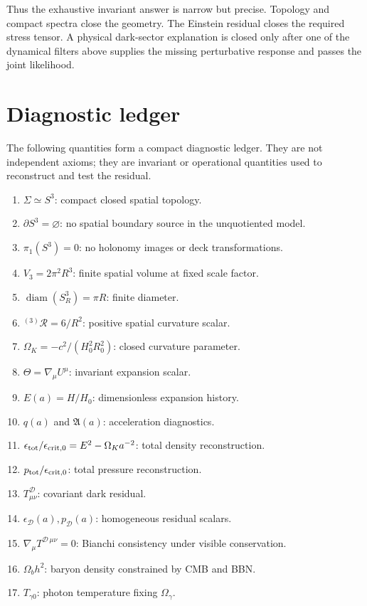 \documentclass[
  aps,
  prd,
  reprint,
  superscriptaddress,
  nofootinbib,
  floatfix,
  longbibliography
]{revtex4-2}
\theoremstyle{plain}
\theoremstyle{definition}
\theoremstyle{remark}
\newcommand{\D}{\mathcal D}
\newcommand{\crit}{\epsilon_{\mathrm{crit},0}}
\newcommand{\Omk}{\Omega_K}
\newcommand{\diam}{\operatorname{diam}}
\newcommand{\Aacc}{\mathfrak A}
\newcommand{\Thetaexp}{\Theta}
\begin{document}
Thus the exhaustive invariant answer is narrow but precise.  Topology and
compact spectra close the geometry.  The Einstein residual closes the required
stress tensor.  A physical dark-sector explanation is closed only after one of
the dynamical filters above supplies the missing perturbative response and
passes the joint likelihood.

\section{Diagnostic ledger}

The following quantities form a compact diagnostic ledger.  They are not
independent axioms; they are invariant or operational quantities used to
reconstruct and test the residual.

\begin{enumerate}
\item $\Sigma\simeq S^3$: compact closed spatial topology.
\item $\partial S^3=\varnothing$: no spatial boundary source in the unquotiented model.
\item $\pi_1(S^3)=0$: no holonomy images or deck transformations.
\item $V_3=2\pi^2R^3$: finite spatial volume at fixed scale factor.
\item $\diam(S^3_R)=\pi R$: finite diameter.
\item ${}^{(3)}\mathcal R=6/R^2$: positive spatial curvature scalar.
\item $\Omk=-c^2/(H_0^2R_0^2)$: closed curvature parameter.
\item $\Thetaexp=\nabla_\mu U^\mu$: invariant expansion scalar.
\item $E(a)=H/H_0$: dimensionless expansion history.
\item $q(a)$ and $\Aacc(a)$: acceleration diagnostics.
\item $\epsilon_{\rm tot}/\crit=E^2-\Omk a^{-2}$: total density reconstruction.
\item $p_{\rm tot}/\crit$: total pressure reconstruction.
\item $T^\D_{\mu\nu}$: covariant dark residual.
\item $\epsilon_\D(a),p_\D(a)$: homogeneous residual scalars.
\item $\nabla_\mu T^{\D\,\mu\nu}=0$: Bianchi consistency under visible conservation.
\item $\Omega_bh^2$: baryon density constrained by CMB and BBN.
\item $T_{\gamma0}$: photon temperature fixing $\Omega_\gamma$.

\end{enumerate}
\end{document}
